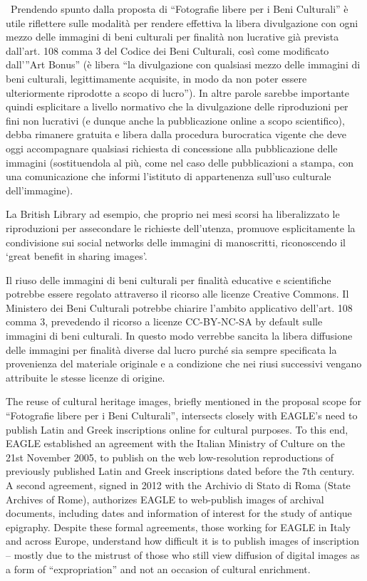 \documentclass[amsthm,ebook]{saparticle}
\begin{document}
\ Prendendo spunto dalla proposta di “Fotografie libere per i Beni Culturali” è utile riflettere sulle modalità per
rendere effettiva la libera divulgazione con ogni mezzo delle immagini di beni culturali per finalità non lucrative già
prevista dall’art. 108 comma 3 del Codice dei Beni Culturali, così come modificato dall’”Art Bonus” (è libera “la
divulgazione con qualsiasi mezzo delle immagini di beni culturali, legittimamente acquisite, in modo da non poter
essere ulteriormente riprodotte a scopo di lucro”). In altre parole sarebbe importante quindi esplicitare a livello
normativo che la divulgazione delle riproduzioni per fini non lucrativi (e dunque anche la pubblicazione online a scopo
scientifico), debba rimanere gratuita e libera dalla procedura burocratica vigente che deve oggi accompagnare qualsiasi
richiesta di concessione alla pubblicazione delle immagini (sostituendola al più, come nel caso delle pubblicazioni a
stampa, con una comunicazione che informi l’istituto di appartenenza sull’uso culturale dell’immagine).

La British Library ad esempio, che proprio nei mesi scorsi ha liberalizzato le riproduzioni per assecondare le richieste
dell’utenza, promuove esplicitamente la condivisione sui social networks delle immagini di manoscritti, riconoscendo il
‘great benefit in sharing images’. 

Il riuso delle immagini di beni culturali per finalità educative e scientifiche potrebbe essere regolato attraverso il
ricorso alle licenze Creative Commons. Il Ministero dei Beni Culturali potrebbe chiarire l’ambito applicativo dell’art.
108 comma 3, prevedendo il ricorso a licenze CC-BY-NC-SA by default sulle immagini di beni culturali. In questo modo
verrebbe sancita la libera diffusione delle immagini per finalità diverse dal lucro purché sia sempre specificata la
provenienza del materiale originale e a condizione che nei riusi successivi vengano attribuite le stesse licenze di
origine. 




The reuse of cultural heritage images, briefly mentioned in the proposal scope for “Fotografie libere per i Beni
Culturali”, intersects closely with EAGLE’s need to publish Latin and Greek inscriptions online for cultural purposes.
To this end, EAGLE established an agreement with the Italian Ministry of Culture on the 21st November 2005, to publish
on the web low-resolution reproductions of previously published Latin and Greek inscriptions dated before the 7th
century. A second agreement, signed in 2012 with the Archivio di Stato di Roma (State Archives of Rome), authorizes
EAGLE to web-publish images of archival documents, including dates and information of interest for the study of antique
epigraphy. Despite these formal agreements, those working for EAGLE in Italy and across Europe, understand how
difficult it is to publish images of inscription – mostly due to the mistrust of those who still view diffusion of
digital images as a form of “expropriation” and not an occasion of cultural enrichment.
\end{document}
